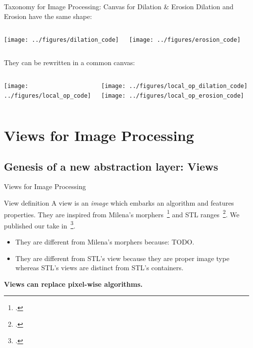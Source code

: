 \documentclass[12pt,aspectratio=169]{beamer}
\begin{document}
\begin{frame}[fragile]{Taxonomy for Image Processing: Canvas for Dilation \& Erosion}
  Dilation and Erosion have the same shape:
  \begin{columns}[T,onlytextwidth]
    \texttt{[image: ../figures/dilation\_code]}

    \texttt{[image: ../figures/erosion\_code]}
  \end{columns}
  \bigskip
  They can be rewritten in a common canvas:
  \begin{columns}[T,onlytextwidth]
    \texttt{[image: ../figures/local\_op\_code]}

    \texttt{[image: ../figures/local\_op\_dilation\_code]}
    \texttt{[image: ../figures/local\_op\_erosion\_code]}
  \end{columns}
\end{frame}

%
%
%
\section[Views for Image Processing]{Views for Image Processing}

\subsection{Genesis of a new abstraction layer: Views}

\begin{frame}[fragile]{Views for Image Processing}
  \begin{alertblock}{View definition}
    A view is an \emph{image} which embarks an algorithm and features properties. They are inspired from Milena's
    morphers~\footcite{levillain.2009.ismm} and STL ranges~\footcite{niebler.2014.ranges}. We published our take
    in~\footcite[]{roynard.2022.gpce}.
    \begin{itemize}
      \item They are different from Milena's morphers because: TODO.
      \item They are different from STL's view because they are proper image type whereas STL's views are distinct from
            STL's containers.
    \end{itemize}
  \end{alertblock}
  \begin{center}\textbf{Views can replace pixel-wise algorithms.}\end{center}
\end{frame}
\end{document}
